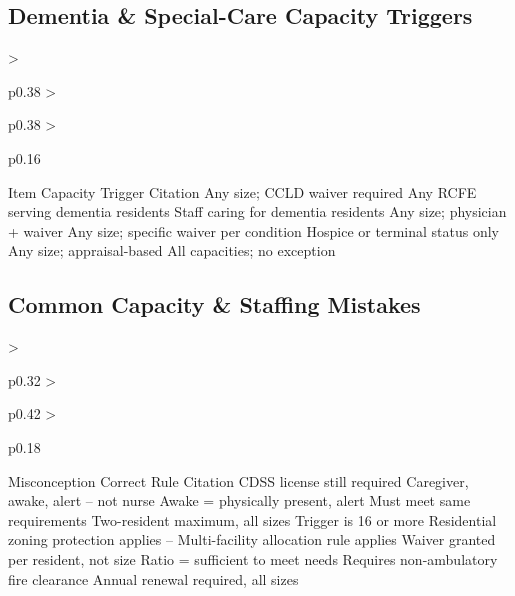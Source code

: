\subsection{Dementia \& Special-Care Capacity Triggers}
\begin{cheattablethree}
  {>{\raggedright\arraybackslash}p{0.38\linewidth}
   >{\raggedright\arraybackslash}p{0.38\linewidth}
   >{\raggedright\arraybackslash}p{0.16\linewidth}}
  {Item}
  {Capacity Trigger}
  {Citation}
    {Any size; CCLD waiver required}
    {}
    {Any RCFE serving dementia residents}
    {}
    {Staff caring for dementia residents}
    {}
    {Any size; physician + waiver}
    {}
    {Any size; specific waiver per condition}
    {}
    {Hospice or terminal status only}
    {}
    {Any size; appraisal-based}
    {}
    {All capacities; no exception}
    {}
\end{cheattablethree}

\subsection{Common Capacity \& Staffing Mistakes}
\begin{cheattablethree}
  {>{\raggedright\arraybackslash}p{0.32\linewidth}
   >{\raggedright\arraybackslash}p{0.42\linewidth}
   >{\raggedright\arraybackslash}p{0.18\linewidth}}
  {Misconception}
  {Correct Rule}
  {Citation}
    {CDSS license still required}
    {}
    {Caregiver, awake, alert -- not nurse}
    {}
    {Awake = physically present, alert}
    {}
    {Must meet same requirements}
    {}
    {Two-resident maximum, all sizes}
    {}
    {Trigger is 16 or more}
    {}
    {Residential zoning protection applies}
    {--}
    {Multi-facility allocation rule applies}
    {}
    {Waiver granted per resident, not size}
    {}
    {Ratio = sufficient to meet needs}
    {}
    {Requires non-ambulatory fire clearance}
    {}
    {Annual renewal required, all sizes}
    {}
\end{cheattablethree}
\clearpage

